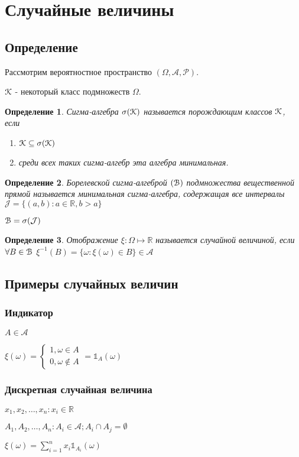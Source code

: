 \documentclass{report}
\newtheorem*{opred}{Определение}
\newcommand{\A}{\mathcal{A}}
\newcommand{\B}{\EuScript{B}}
\newcommand{\J}{\mathcal{J}}
\newcommand{\K}{\EuScript{K}}
\newcommand{\o}{\sigma}
\renewcommand{\P}{\mathcal{P}}
\newcommand{\R}{\mathbb{R}}
\newcommand{\w}{\omega}
\newcommand{\W}{\Omega}
\newcommand{\1}{\mathds{1}}
\begin{document}
\chapter*{Случайные величины}
\section*{Определение}
Рассмотрим вероятностное пространство $(\W, \A, \P)$.

$\K$ - некоторый класс подмножеств $\W$.
\begin{opred}
Сигма-алгебра $\o(\K)$ называется порождающим классов $\K$, если
\begin{enumerate}
\item $\K\subseteq\o(\K)$
\item среди всех таких сигма-алгебр эта алгебра минимальная.
\end{enumerate}
\end{opred}
\begin{opred}
Борелевской сигма-алгеброй $(\B)$ подмножества вещественной прямой называется минимальная сигма-алгебра, содержащая все интервалы $\J=\{(a,b):a\in\R, b>a\}$

$\B=\o(\J)$
\end{opred}
\begin{opred}
Отображение $\xi:\W\mapsto\R$ называется случайной величиной, если $\forall B\in\B$ $\xi^{-1}(B)=\{\w:\xi(\w)\in B\}\in\A$
\end{opred}
\section*{Примеры случайных величин}
\subsection*{Индикатор}
$A\in\A$

$\xi(\w)=\left\{\begin{matrix}
1, \w\in A\\
0, \w\notin A
\end{matrix}\right.=\1_A(\w)$
\subsection*{Дискретная случайная величина}
$x_1,x_2,\ldots,x_n\colon x_i\in\R$

$A_1,A_2,\ldots,A_n\colon A_i\in\A; A_i\cap A_j=\emptyset$

$\xi(\w)=\sum\limits_{i=1}^nx_i\1_{A_i}(\w)$
\end{document}
